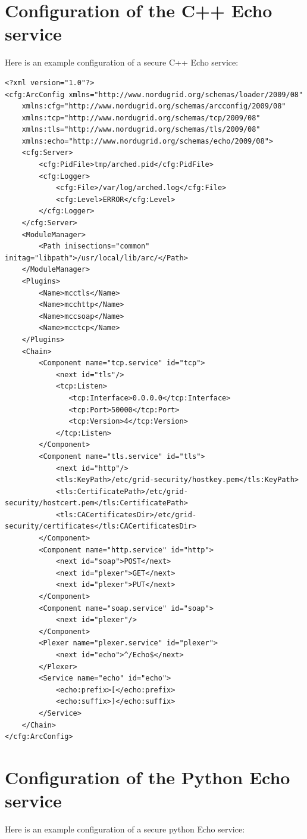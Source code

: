 \documentclass{article}
\begin{document}
\section{Configuration of the C++ Echo service} %
\label{sec:configuration}
Here is an example configuration of a secure C++ Echo service:

\begin{verbatim}
<?xml version="1.0"?>
<cfg:ArcConfig xmlns="http://www.nordugrid.org/schemas/loader/2009/08"
	xmlns:cfg="http://www.nordugrid.org/schemas/arcconfig/2009/08"
	xmlns:tcp="http://www.nordugrid.org/schemas/tcp/2009/08"
	xmlns:tls="http://www.nordugrid.org/schemas/tls/2009/08"
	xmlns:echo="http://www.nordugrid.org/schemas/echo/2009/08">
    <cfg:Server>
        <cfg:PidFile>tmp/arched.pid</cfg:PidFile>
        <cfg:Logger>
            <cfg:File>/var/log/arched.log</cfg:File>
            <cfg:Level>ERROR</cfg:Level>
        </cfg:Logger>
    </cfg:Server>
    <ModuleManager>
        <Path inisections="common" initag="libpath">/usr/local/lib/arc/</Path>
    </ModuleManager>
    <Plugins>
        <Name>mcctls</Name>
        <Name>mcchttp</Name>
        <Name>mccsoap</Name>
        <Name>mcctcp</Name>
    </Plugins>
    <Chain>
        <Component name="tcp.service" id="tcp">
            <next id="tls"/>
            <tcp:Listen>
               <tcp:Interface>0.0.0.0</tcp:Interface>
               <tcp:Port>50000</tcp:Port>
               <tcp:Version>4</tcp:Version>
            </tcp:Listen>
        </Component>
        <Component name="tls.service" id="tls">
            <next id="http"/>
            <tls:KeyPath>/etc/grid-security/hostkey.pem</tls:KeyPath>
            <tls:CertificatePath>/etc/grid-security/hostcert.pem</tls:CertificatePath>
            <tls:CACertificatesDir>/etc/grid-security/certificates</tls:CACertificatesDir>
        </Component>
        <Component name="http.service" id="http">
            <next id="soap">POST</next>
            <next id="plexer">GET</next>
            <next id="plexer">PUT</next>
        </Component>
        <Component name="soap.service" id="soap">
            <next id="plexer"/>
        </Component>
        <Plexer name="plexer.service" id="plexer">
            <next id="echo">^/Echo$</next>
        </Plexer>
        <Service name="echo" id="echo">
            <echo:prefix>[</echo:prefix>
            <echo:suffix>]</echo:suffix>
        </Service>
    </Chain>
</cfg:ArcConfig>
\end{verbatim}

\section{Configuration of the Python Echo service} %
\label{sec:configuration_of_the_python_echo_service}
Here is an example configuration of a secure python Echo service:
\end{document}
